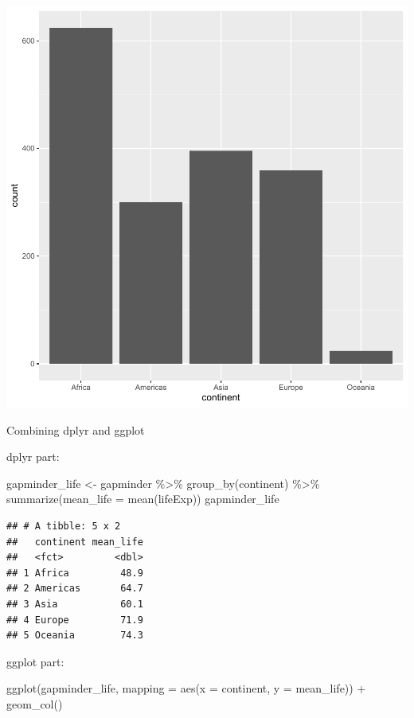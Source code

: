 \documentclass[
]{book}
\makeatletter
\newenvironment{Shaded}{\begin{snugshade}}{\end{snugshade}}
\newcommand{\AttributeTok}[1]{\textcolor[rgb]{0.61,0.61,0.61}{#1}}
\newcommand{\FunctionTok}[1]{\textcolor[rgb]{0,0,0}{#1}}
\newcommand{\NormalTok}[1]{#1}
\newcommand{\OtherTok}[1]{\textcolor[rgb]{0.37,0.37,0.37}{#1}}
\newcommand{\SpecialCharTok}[1]{\textcolor[rgb]{0,0,0}{#1}}
\newenvironment{kframe}{%
\medskip{}
\setlength{\fboxsep}{.8em}
 \def\at@end@of@kframe{}%
 \ifinner\ifhmode%
  \def\at@end@of@kframe{\end{minipage}}%
  \begin{minipage}{\columnwidth}%
 \fi\fi%
 \def\FrameCommand##1{\hskip\@totalleftmargin \hskip-\fboxsep
 \colorbox{shadecolor}{##1}\hskip-\fboxsep
     \hskip-\linewidth \hskip-\@totalleftmargin \hskip\columnwidth}%
 \MakeFramed {\advance\hsize-\width
   \@totalleftmargin\z@ \linewidth\hsize
   \@setminipage}}%
 {\par\unskip\endMakeFramed%
 \at@end@of@kframe}
\renewenvironment{Shaded}{\begin{kframe}}{\end{kframe}}
\makeatother
\begin{document}
\begin{center}\includegraphics[width=0.7\linewidth,keepaspectratio]{Multivariable_Data_Analysis_files/figure-latex/unnamed-chunk-68-1} \end{center}

Combining dplyr and ggplot

dplyr part:

\begin{Shaded}
\begin{Highlighting}[]
\NormalTok{gapminder\_life }\OtherTok{\textless{}{-}}\NormalTok{ gapminder }\SpecialCharTok{\%\textgreater{}\%} \FunctionTok{group\_by}\NormalTok{(continent) }\SpecialCharTok{\%\textgreater{}\%} 
  \FunctionTok{summarize}\NormalTok{(}\AttributeTok{mean\_life =} \FunctionTok{mean}\NormalTok{(lifeExp)) }
\NormalTok{gapminder\_life}
\end{Highlighting}
\end{Shaded}

\begin{verbatim}
## # A tibble: 5 x 2
##   continent mean_life
##   <fct>         <dbl>
## 1 Africa         48.9
## 2 Americas       64.7
## 3 Asia           60.1
## 4 Europe         71.9
## 5 Oceania        74.3
\end{verbatim}

ggplot part:

\begin{Shaded}
\begin{Highlighting}[]
\FunctionTok{ggplot}\NormalTok{(gapminder\_life, }\AttributeTok{mapping =} \FunctionTok{aes}\NormalTok{(}\AttributeTok{x =}\NormalTok{ continent, }\AttributeTok{y =}\NormalTok{ mean\_life)) }\SpecialCharTok{+} \FunctionTok{geom\_col}\NormalTok{()}
\end{Highlighting}
\end{Shaded}
\end{document}
